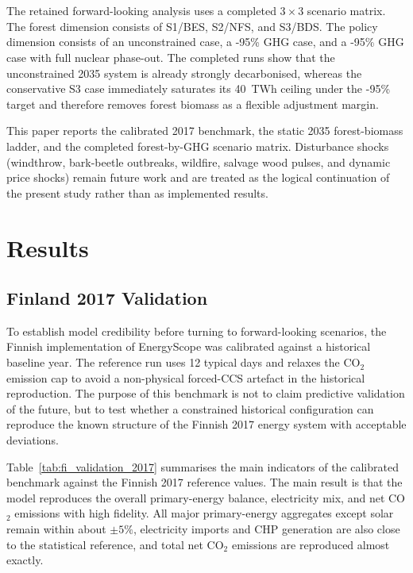 \documentclass{article}
\begin{document}
\\\\
The retained forward-looking analysis uses a completed $3 \times 3$ scenario matrix. The forest dimension consists of S1/BES, S2/NFS, and S3/BDS. The policy dimension consists of an unconstrained case, a -95\% GHG case, and a -95\% GHG case with full nuclear phase-out. The completed runs show that the unconstrained 2035 system is already strongly decarbonised, whereas the conservative S3 case immediately saturates its 40~TWh ceiling under the -95\% target and therefore removes forest biomass as a flexible adjustment margin.


This paper reports the calibrated 2017 benchmark, the static 2035 forest-biomass ladder, and the completed forest-by-GHG scenario matrix. Disturbance shocks (windthrow, bark-beetle outbreaks, wildfire, salvage wood pulses, and dynamic price shocks) remain future work and are treated as the logical continuation of the present study rather than as implemented results.

\section{Results}
\label{sec:results}

\subsection{Finland 2017 Validation}

To establish model credibility before turning to forward-looking scenarios, the Finnish implementation of EnergyScope was calibrated against a historical baseline year. The reference run uses 12 typical days and relaxes the CO$_2$ emission cap to avoid a non-physical forced-CCS artefact in the historical reproduction. The purpose of this benchmark is not to claim predictive validation of the future, but to test whether a constrained historical configuration can reproduce the known structure of the Finnish 2017 energy system with acceptable deviations.


Table~\ref{tab:fi_validation_2017} summarises the main indicators of the calibrated benchmark against the Finnish 2017 reference values. The main result is that the model reproduces the overall primary-energy balance, electricity mix, and net CO$_2$ emissions with high fidelity. All major primary-energy aggregates except solar remain within about $\pm 5\%$, electricity imports and CHP generation are also close to the statistical reference, and total net CO$_2$ emissions are reproduced almost exactly.
\end{document}

